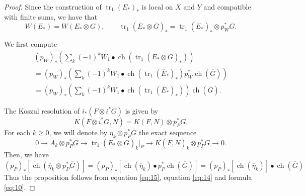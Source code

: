 \documentclass[10pt,twoside]{article}
\numberwithin{equation}{section}
\theoremstyle{plain}
\theoremstyle{definition}
\DeclareMathOperator{\tr}{tr}
\DeclareMathOperator{\ch}{ch}
\begin{document}
\begin{proof}
  Since the construction of $\tr_{1}(E_{\ast})_{\ast}$ is local on $X$ and $Y$ and
  compatible with finite sums, we have that
  \begin{displaymath}
    W(E_{\ast})=W(E_{\ast}\otimes G), \qquad
    \tr_{1}(\overline E_{\ast}\otimes \overline
    G)_{\ast}=\tr_{1}(\overline E_{\ast})_{\ast}\otimes 
    p_{W}^{\ast}\overline G.
  \end{displaymath}

  We first compute
  \begin{multline}\label{eq:15}
    (p_{W})_{\ast}\left(\sum_{k}(-1)^{k}W_{1} \bullet \ch(\tr_{1}(\overline E_{\ast}\otimes
      \overline G)_{\ast })
      \right)\\
      =(p_{W})_{\ast}\left(\sum_{k}(-1)^{k}W_{1} \bullet \ch(\tr_{1}(\overline
        E_{\ast})_{\ast })p^{\ast}_{W}\ch(
      \overline G)
      \right)\\
      =(p_{W})_{\ast}\left(\sum_{k}(-1)^{k}W_{1} \bullet \ch(\tr_{1}(\overline
        E_{\ast})_{\ast }) 
      \right)\ch(
      \overline G). 
  \end{multline}

  The Koszul resolution of $i_{\ast}(F\otimes i^{\ast} G)$ is given by
  \begin{displaymath}
    K(F\otimes i^{\ast} G,N)= K(F,N)\otimes p_{P}^{\ast} G.
  \end{displaymath}
  For each $k\ge 0$, we will denote by $\overline \eta_{k}\otimes  p_{P}^{\ast}
  \overline G$ the exact sequence
  \begin{displaymath}
    0\longrightarrow \overline A_{k}\otimes  p_{P}^{\ast}
  \overline G \longrightarrow \tr_{1}(\overline
     E_{\ast}\otimes  \overline G)_{k}|_{P} 
     \longrightarrow K(\overline F,\overline N)_{k}\otimes  p_{P}^{\ast}
  \overline G \longrightarrow 0. 
  \end{displaymath}
  Then, we have 
  \begin{equation}
    \label{eq:14}
    (p_{P})_{\ast}[\widetilde{\ch}(\overline \eta_{k}\otimes  p_{P}^{\ast}
  \overline G)]=(p_{P})_{\ast}[\widetilde{\ch}(\overline
  \eta_{k})\bullet  p_{P}^{\ast} 
  \ch(\overline G)]=
  (p_{P})_{\ast}[\widetilde{\ch}(\overline \eta_{k})]\bullet 
  \ch(\overline G)
  \end{equation}
  Thus the proposition follows from equation \eqref{eq:15},  equation
  \eqref{eq:14} and formula \eqref{eq:10}.
\end{proof}
\end{document}
